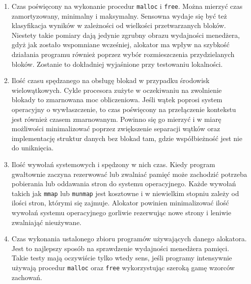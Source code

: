 \documentclass[12pt,a4paper,titlepage,twoside]{mwart}
\begin{document}
\begin{enumerate}

\item Czas poświęcony na wykonanie procedur \texttt{malloc} i \texttt{free}.
Można mierzyć czas zamortyzowany, minimalny i maksymalny. Sensowna wydaje się
być też klasyfikacja wyników w zależności od wielkości przetwarzanych bloków.
Niestety takie pomiary dają jedynie zgrubny obrazu wydajności menedżera, gdyż
jak zostało wspomniane wcześniej, alokator ma wpływ na szybkość działania
programu również poprzez wybór rozmieszczenia przydzielanych bloków. Zostanie
to dokładniej wyjaśnione przy testowaniu lokalności.

\vspace{1ex}

\item Ilość czasu spędzanego na obsługę blokad w przypadku środowisk
wielowątkowych. Cykle procesora zużyte w oczekiwaniu na zwolnienie blokady to
zmarnowana moc obliczeniowa. Jeśli wątek poprosi system operacyjny o
wywłaszczenie, to czas poświęcony na przełączenie kontekstu jest również czasem
zmarnowanym. Powinno się go mierzyć i w miarę możliwości minimalizować poprzez
zwiększenie separacji wątków oraz implementację struktur danych bez blokad tam,
gdzie współbieżność jest nie do uniknięcia.

\vspace{1ex}

\item Ilość wywołań systemowych i spędzony w nich czas. Kiedy program
gwałtownie zaczyna rezerwować lub zwalniać pamięć może zachodzić potrzeba
pobierania lub oddawania stron do systemu operacyjnego. Każde wywołań takich
jak \texttt{mmap} lub \texttt{munmap} jest kosztowne i w niewielkim stopniu
zależy od ilości stron, którymi się zajmuje. Alokator powinien minimalizować
ilość wywołań systemu operacyjnego gorliwie rezerwując nowe strony i leniwie
zwalniająć nieużywane.

\vspace{1ex}

\item Czas wykonania ustalonego zbioru programów używających danego alokatora.
Jest to najlepszy sposób na sprawdzenie wydajności menedżera pamięci. Takie
testy mają oczywiście tylko wtedy sens, jeśli programy intensywnie używają
procedur \texttt{malloc} oraz \texttt{free} wykorzystując szeroką gamę wzorców
zachowań.

\end{enumerate}
\end{document}
